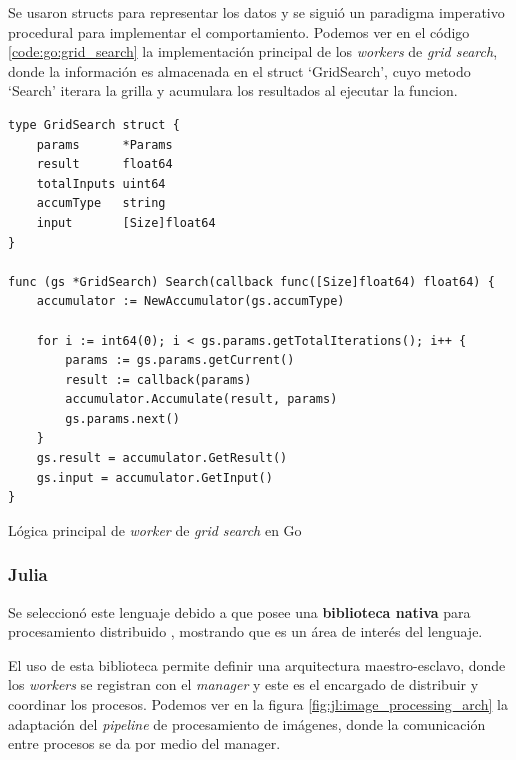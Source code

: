 \documentclass[11pt]{article}
\let\Oldsubsubsection\subsubsection
\renewcommand{\subsubsection}{\FloatBarrier\Oldsubsubsection}
\begin{document}
Se usaron structs para representar los datos y se siguió un paradigma imperativo procedural para implementar el comportamiento. Podemos ver en el código \ref{code:go:grid_search} la implementación principal de los \textit{workers} de \textit{grid search}, donde la información es almacenada en el struct `GridSearch', cuyo metodo `Search' iterara la grilla y acumulara los resultados al ejecutar la funcion.

\begin{listing}[ht]
\begin{verbatim}
type GridSearch struct {
	params      *Params
	result      float64
	totalInputs uint64
	accumType   string
	input       [Size]float64
}

func (gs *GridSearch) Search(callback func([Size]float64) float64) {
	accumulator := NewAccumulator(gs.accumType)

	for i := int64(0); i < gs.params.getTotalIterations(); i++ {
		params := gs.params.getCurrent()
		result := callback(params)
		accumulator.Accumulate(result, params)
		gs.params.next()
	}
	gs.result = accumulator.GetResult()
	gs.input = accumulator.GetInput()
}
\end{verbatim}
\caption{Lógica principal de \textit{worker} de \textit{grid search} en Go}
\label{code:go:grid_search}
\end{listing}


\subsubsection{Julia}

Se seleccionó este lenguaje debido a que posee una \textbf{biblioteca nativa} para procesamiento distribuido \cite{jl:lib:distributed}, mostrando que es un área de interés del lenguaje.

El uso de esta biblioteca permite definir una arquitectura maestro-esclavo, donde los \textit{workers} se registran con el \textit{manager} y este es el encargado de distribuir y coordinar los procesos. Podemos ver en la figura \ref{fig:jl:image_processing_arch} la adaptación del \textit{pipeline} de procesamiento de imágenes, donde la comunicación entre procesos se da por medio del manager.
\end{document}
